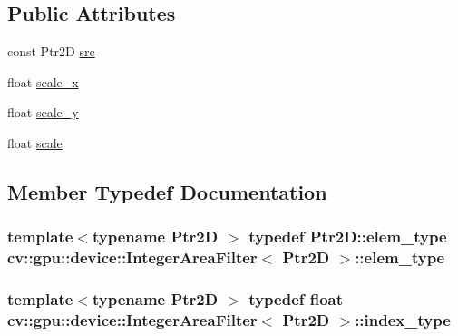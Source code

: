 \subsection*{Public Attributes}
\begin{DoxyCompactItemize}
\item 
const Ptr2\-D \hyperlink{structcv_1_1gpu_1_1device_1_1IntegerAreaFilter_a00746bbccaae575eb5fbb168283206c1}{src}
\item 
float \hyperlink{structcv_1_1gpu_1_1device_1_1IntegerAreaFilter_a9cb14c7aad58b2adb9f58fcd5477d757}{scale\-\_\-x}
\item 
float \hyperlink{structcv_1_1gpu_1_1device_1_1IntegerAreaFilter_afa02851ec89c4fc26e3eaf7e293ed1f4}{scale\-\_\-y}
\item 
float \hyperlink{structcv_1_1gpu_1_1device_1_1IntegerAreaFilter_af766294e022ac79f94d466710a097f47}{scale}
\end{DoxyCompactItemize}


\subsection{Member Typedef Documentation}
\hypertarget{structcv_1_1gpu_1_1device_1_1IntegerAreaFilter_a7ffe790b71c31c44a851412e756f0a39}{
\subsubsection[{elem\-\_\-type}]{\setlength{\rightskip}{0pt plus 5cm}template$<$typename Ptr2\-D $>$ typedef Ptr2\-D\-::elem\-\_\-type {\bf cv\-::gpu\-::device\-::\-Integer\-Area\-Filter}$<$ Ptr2\-D $>$\-::{\bf elem\-\_\-type}}}\label{structcv_1_1gpu_1_1device_1_1IntegerAreaFilter_a7ffe790b71c31c44a851412e756f0a39}
\hypertarget{structcv_1_1gpu_1_1device_1_1IntegerAreaFilter_ae5012b8b53db14ff0903d877969e9a73}{
\subsubsection[{index\-\_\-type}]{\setlength{\rightskip}{0pt plus 5cm}template$<$typename Ptr2\-D $>$ typedef float {\bf cv\-::gpu\-::device\-::\-Integer\-Area\-Filter}$<$ Ptr2\-D $>$\-::{\bf index\-\_\-type}}}\label{structcv_1_1gpu_1_1device_1_1IntegerAreaFilter_ae5012b8b53db14ff0903d877969e9a73}


